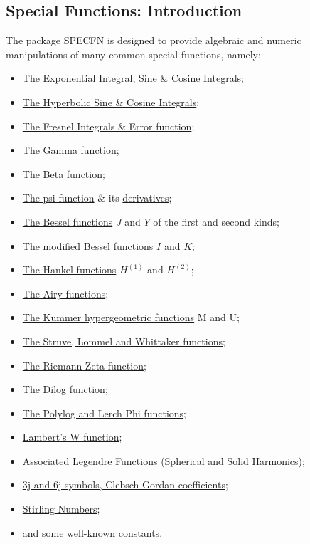 \subsection{Special Functions: Introduction}
 
 
\hypertarget{SPECFNS}{}
\ifdefined{}\fi
%
The package SPECFN is designed to provide algebraic and numeric manipulations of
many common special functions, namely:

\begin{itemize}
\item \hyperlink{INTEGF}{The Exponential Integral, Sine \& Cosine Integrals};
\item \hyperlink{INTEGF}{The Hyperbolic Sine \& Cosine Integrals};
\item \hyperlink{INTEGF}{The Fresnel Integrals \& Error function};
\item \hyperlink{GAMMF}{The Gamma function};
\item \hyperlink{BETAF}{The Beta function};
\item \hyperlink{DIGAM}{The psi function} \& its \hyperlink{POLYGAM}{derivatives};
\item \hyperlink{BESSELF}{The Bessel functions} $J$ and $Y$ of the first and second kinds;
\item \hyperlink{BESSELF}{The modified Bessel functions} $I$ and $K$;
\item \hyperlink{BESSELF}{The Hankel functions} $H^{(1)}$ and $H^{(2)}$;
\item \hyperlink{AIRYF}{The Airy functions};
\item \hyperlink{HYPERGEOM}{The Kummer hypergeometric functions} M and U;
\item \hyperlink{HYPERGEOM}{The Struve, Lommel and Whittaker functions};
\item \hyperlink{RIEMZETA}{The Riemann Zeta function};
\item \hyperlink{POLYLOG}{The Dilog function};
\item \hyperlink{POLYLOG}{The Polylog and Lerch Phi functions};
\item \hyperlink{LAMBERTW}{Lambert's W function};
\item \hyperlink{SPHSOLH}{Associated Legendre Functions}
(Spherical and Solid Harmonics);
\item \hyperlink{CLEBSCHG}{3j and 6j symbols, Clebsch-Gordan coefficients};
\item \hyperlink{STIRL}{Stirling Numbers};
\item and some \hyperlink{CONSTS}{well-known constants}.
\end{itemize}

